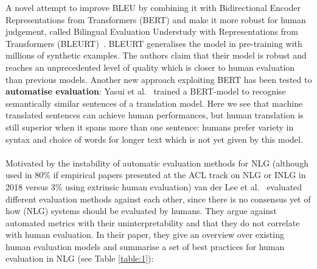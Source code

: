 \documentclass[11pt]{article}
\begin{document}
A novel attempt to improve BLEU by combining it with Bidirectional Encoder Representations from Transformers (BERT) and make it more robust for human judgement, called Bilingual Evaluation Understudy with Representations from Transformers (BLEURT)~\cite{papineni-etal-2002-bleu,sellam2020bleurt}. BLEURT generalises the model in pre-training with millions of synthetic examples. The authors claim that their model is robust and reaches an unprecedented level of quality which is closer to human evaluation than previous models. Another new approach exploiting BERT has been tested to \textbf{automatise evaluation}: Yasui et al.~ trained a BERT-model to recognise semantically similar sentences of a translation model. Here we see that machine translated sentences can achieve human performances, but human translation is still superior when it spans more than one sentence: humans prefer variety in syntax and choice of words for longer text which is not yet given by this model. \\\\
Motivated by the instability of automatic evaluation methods for NLG (although used in 80\% if empirical papers presented at the ACL track on NLG or INLG in 2018 versus 3\% using extrinsic human evaluation) van der Lee et al.~ evaluated different evaluation methods against each other, since there is no consensus yet of how (NLG) systems should be evaluated by humans. They argue against automated metrics with their uninterpretability and that they do not correlate with human evaluation. In their paper, they give an overview over existing human evaluation models and summarise a set of best practices for human evaluation in NLG (see Table \ref{table:1}):\\
\end{document}
